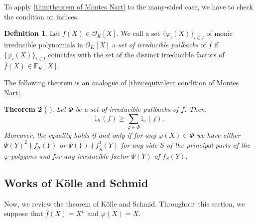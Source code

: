\documentclass{article}
\newcommand{\field}[1]{\mathbb{#1}}
\newcommand{\F}{\field{F}}
\newcommand{\Oint}{\mathcal{O}}
\newcommand{\iK}{\mathrm{i}_{K}}
\newcommand{\iphi}{\mathrm{i}_{\varphi}}
\newtheorem{theorem}{Theorem}[section]
\theoremstyle{definition}
\newtheorem{definition}[theorem]{Definition}
\theoremstyle{remark}
\numberwithin{equation}{section}
\begin{document}
    To apply \cref{thm:theorem of Montes Nart} to the many-sided case, 
    we have to check the condition on indices. 

    \begin{definition}
        Let $f(X) \in \Oint_{K}[X]$.
        We call a set $\{\varphi_{i}(X)\}_{i \in I}$ of monic irreducible polynomials in $\Oint_{K}[X]$
        a \emph{set of irreducible pullbacks} of $f$
        if $\{\overline{\varphi_{i}}(X)\}_{i \in I}$ coincides with 
        the set of the distinct irreducible factors of $\overline{f}(X) \in \F_{K}[X]$.
    \end{definition} 

    The following theorem is an analogue of \cref{thm:equivalent condition of Montes Nart}. 

    \begin{theorem}[{\cite[Theorem 2]{MR1152908} \cite[Theorem 3.1]{index}}]\label{thm:theorem of index}
        Let $\Phi$ be a set of irreducible pullbacks of $f$.
        Then,
        \[
            \iK(f) \ge \sum_{\varphi \in \Phi} \iphi(f). \label{1:ineq:thm}
        \]
        Moreover, the equality holds if and only if for any $\varphi(X) \in \Phi$
        we have either $\Psi(Y)^2 \nmid f_{S}(Y)$ or $\Psi(Y) \nmid f^{1}_{\tilde{S}}(Y)$
        for any side $S$ of the principal parts
        of the $\varphi$-polygons and
        for any irreducible factor $\Psi(Y)$ of $f_{S}(Y)$.
    \end{theorem}

  \subsection{Works of Kölle and Schmid}\label{sec:Kölle Schmid}

    Now, we review the theorem of Kölle and Schmid. 
    Throughout this section, we suppose that $\overline{f}(X) = X^n$ and $\varphi(X) = X$. 
\end{document}
